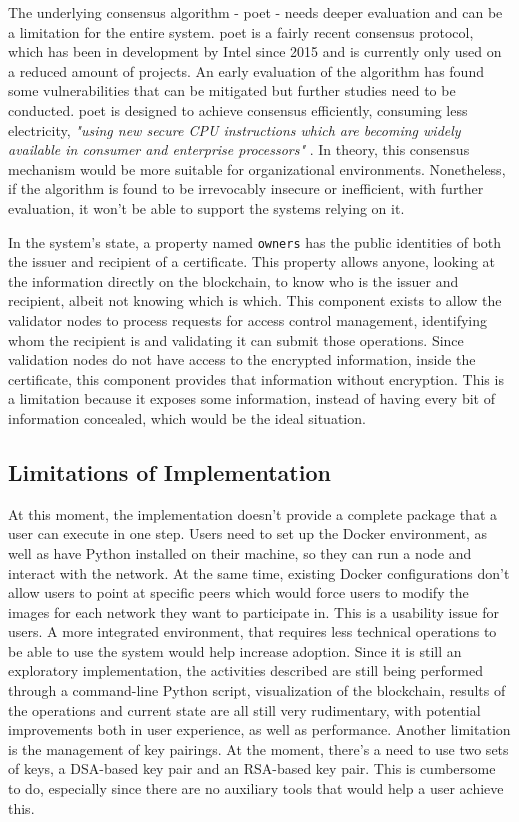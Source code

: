 The underlying consensus algorithm - \gls{poet} - needs deeper evaluation and can be a limitation for the entire system. \gls{poet} is a fairly recent consensus protocol, which has been in development by Intel since 2015 and is currently only used on a reduced amount of projects. An early evaluation of the algorithm has found some vulnerabilities that can be mitigated \cite{chen_security_2017} but further studies need to be conducted. \gls{poet} is designed to achieve consensus efficiently, consuming less electricity, \emph{"using new secure CPU instructions which are becoming widely available in consumer and enterprise processors"} \cite{intel_poet}. In theory, this consensus mechanism would be more suitable for organizational environments. Nonetheless, if the algorithm is found to be irrevocably insecure or inefficient, with further evaluation, it won't be able to support the systems relying on it.

In the system's state, a property named \texttt{owners} has the public identities of both the issuer and recipient of a certificate. This property allows anyone, looking at the information directly on the blockchain, to know who is the issuer and recipient, albeit not knowing which is which. This component exists to allow the validator nodes to process requests for access control management, identifying whom the recipient is and validating it can submit those operations. Since validation nodes do not have access to the encrypted information, inside the certificate, this component provides that information without encryption. This is a limitation because it exposes some information, instead of having every bit of information concealed, which would be the ideal situation.

\subsection{Limitations of Implementation}

At this moment, the implementation doesn't provide a complete package that a user can execute in one step. Users need to set up the Docker environment, as well as have Python installed on their machine, so they can run a node and interact with the network. At the same time, existing Docker configurations don't allow users to point at specific peers which would force users to modify the images for each network they want to participate in. This is a usability issue for users. A more integrated environment, that requires less technical operations to be able to use the system would help increase adoption. Since it is still an exploratory implementation, the activities described are still being performed through a command-line Python script, visualization of the blockchain, results of the operations and current state are all still very rudimentary, with potential improvements both in user experience, as well as performance. Another limitation is the management of key pairings. At the moment, there's a need to use two sets of keys, a DSA-based key pair and an RSA-based key pair. This is cumbersome to do, especially since there are no auxiliary tools that would help a user achieve this.